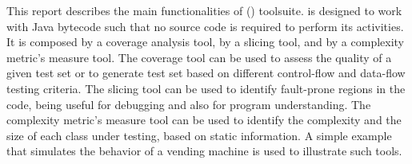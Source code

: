 \begin{summary}

This report describes the main functionalities of \toolname
(\tooldesc) toolsuite. \toolname is designed to work with Java
bytecode such that no source code is required to perform its
activities. It is composed by a coverage analysis tool, by a
slicing tool, and by a complexity metric's measure tool. The
coverage tool can be used to assess the quality of a given test
set or to generate test set based on different control-flow and
data-flow testing criteria. The slicing tool can be used to
identify fault-prone regions in the code, being useful for
debugging and also for program understanding. The complexity
metric's measure tool can be used to identify the complexity and
the size of each class under testing, based on static information.
A simple example that simulates the behavior of a vending machine
is used to illustrate such tools.
\end{summary}
